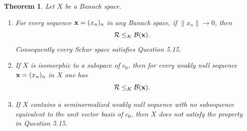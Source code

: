 \documentclass[11pt]{article}
\newtheorem{theorem}{Theorem}
\newcommand{\Rideal}{\mathcal R}
\newcommand{\Bideal}{\mathcal B}
\begin{document}
\begin{theorem}
\label{thm:border}
Let \(X\) be a Banach space.
\begin{enumerate}
\item For every sequence \({\bf x}=(x_n)_n\) in any Banach space, if \(\|x_n\|\to0\), then
\[
        \Rideal\le_K \Bideal({\bf x}).
\]
Consequently every Schur space satisfies Question 5.15.
\item If \(X\) is isomorphic to a subspace of \(c_0\), then for every weakly null sequence \({\bf x}=(x_n)_n\) in \(X\) one has
\[
        \Rideal\le_K \Bideal({\bf x}).
\]
\item If \(X\) contains a seminormalized weakly null sequence with no subsequence equivalent to the unit vector basis of \(c_0\), then \(X\) does not satisfy the property in Question 5.15.
\end{enumerate}
\end{theorem}
\end{document}
